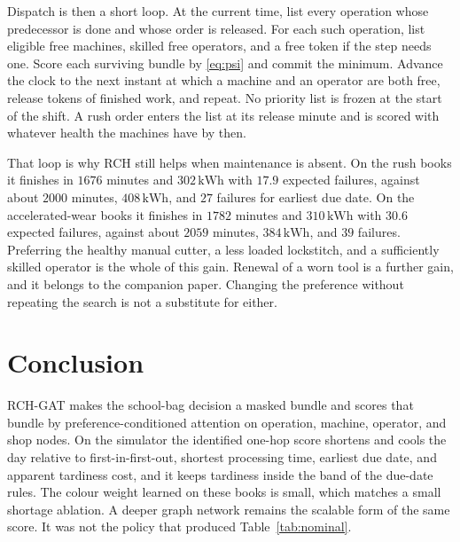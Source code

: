 \documentclass[10pt,a4paper]{article}
\begin{document}
Dispatch is then a short loop. At the current time, list every operation whose predecessor is done and whose order is released. For each such operation, list eligible free machines, skilled free operators, and a free token if the step needs one. Score each surviving bundle by \eqref{eq:psi} and commit the minimum. Advance the clock to the next instant at which a machine and an operator are both free, release tokens of finished work, and repeat. No priority list is frozen at the start of the shift. A rush order enters the list at its release minute and is scored with whatever health the machines have by then.

That loop is why RCH still helps when maintenance is absent. On the rush books it finishes in \(1676\) minutes and \(302\,\mathrm{kWh}\) with \(17.9\) expected failures, against about \(2000\) minutes, \(408\,\mathrm{kWh}\), and \(27\) failures for earliest due date. On the accelerated-wear books it finishes in \(1782\) minutes and \(310\,\mathrm{kWh}\) with \(30.6\) expected failures, against about \(2059\) minutes, \(384\,\mathrm{kWh}\), and \(39\) failures. Preferring the healthy manual cutter, a less loaded lockstitch, and a sufficiently skilled operator is the whole of this gain. Renewal of a worn tool is a further gain, and it belongs to the companion paper. Changing the preference without repeating the search is not a substitute for either.

\section{Conclusion}

RCH-GAT makes the school-bag decision a masked bundle and scores that bundle by preference-conditioned attention on operation, machine, operator, and shop nodes. On the simulator the identified one-hop score shortens and cools the day relative to first-in-first-out, shortest processing time, earliest due date, and apparent tardiness cost, and it keeps tardiness inside the band of the due-date rules. The colour weight learned on these books is small, which matches a small shortage ablation. A deeper graph network remains the scalable form of the same score. It was not the policy that produced Table~\ref{tab:nominal}.
\end{document}
